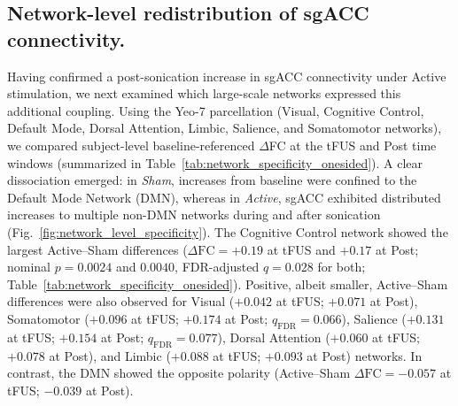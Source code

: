     \subsection*{Network-level redistribution of sgACC connectivity.}
    \noindent
    Having confirmed a post-sonication increase in sgACC connectivity under Active stimulation, we next examined which large-scale networks expressed this additional coupling. Using the Yeo-7 parcellation \cite{yeo2011organization} (Visual, Cognitive Control, Default Mode, Dorsal Attention, Limbic, Salience, and Somatomotor networks), we compared subject-level baseline-referenced $\Delta$FC at the tFUS and Post time windows (summarized in Table~\ref{tab:network_specificity_onesided}). A clear dissociation emerged: in \emph{Sham}, increases from baseline were confined to the Default Mode Network (DMN), whereas in \emph{Active}, sgACC exhibited distributed increases to multiple non-DMN networks during and after sonication (Fig.~\ref{fig:network_level_specificity}). The Cognitive Control network showed the largest Active--Sham differences ($\Delta\mathrm{FC} = +0.19$ at tFUS and $+0.17$ at Post; nominal $p=0.0024$ and $0.0040$, FDR-adjusted $q=0.028$ for both; Table~\ref{tab:network_specificity_onesided}). Positive, albeit smaller, Active--Sham differences were also observed for Visual ($+0.042$ at tFUS; $+0.071$ at Post), Somatomotor ($+0.096$ at tFUS; $+0.174$ at Post; $q_{\mathrm{FDR}}=0.066$), Salience ($+0.131$ at tFUS; $+0.154$ at Post; $q_{\mathrm{FDR}}=0.077$), Dorsal Attention ($+0.060$ at tFUS; $+0.078$ at Post), and Limbic ($+0.088$ at tFUS; $+0.093$ at Post) networks. In contrast, the DMN showed the opposite polarity (Active--Sham $\Delta\mathrm{FC}=-0.057$ at tFUS; $-0.039$ at Post). 


